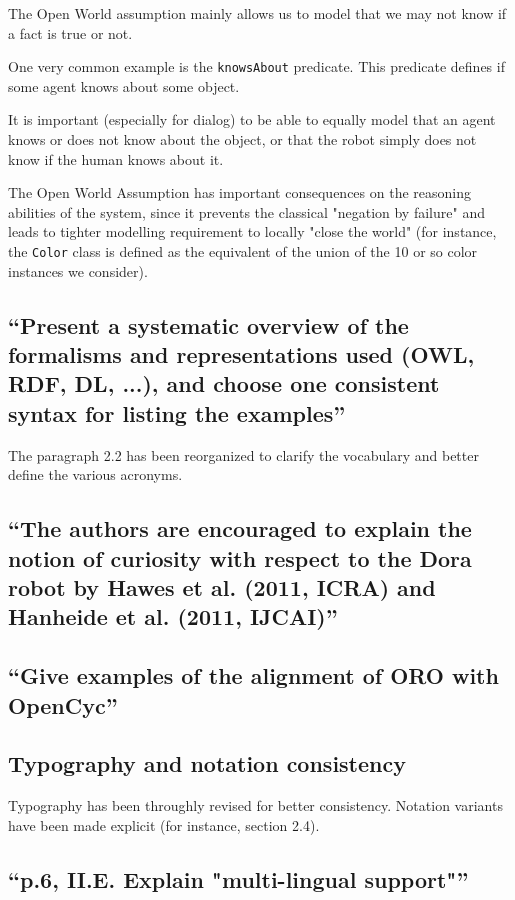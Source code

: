 \documentclass{article}
\begin{document}
The Open World assumption mainly allows us to model that we may not know
if a fact is true or not.

One very common example is the {\tt knowsAbout} predicate. This predicate
defines if some agent knows about some object.

It is important (especially for dialog) to be able to equally model that an agent knows or 
does not know about the object, or that the robot simply does not know if 
the human knows about it.

The Open World Assumption has important consequences on the reasoning
abilities of the system, since it prevents the classical "negation by 
failure" and leads to tighter modelling requirement to locally "close the
world" (for instance, the {\tt Color} class is defined as the equivalent of
the union of the 10 or so color instances we consider).

\subsection{``Present a systematic overview of the formalisms and
representations used (OWL, RDF, DL, ...), and choose one consistent syntax for
listing the examples''}

The paragraph 2.2 has been reorganized to clarify the vocabulary and better
define the various acronyms.

\subsection{``The authors are encouraged to explain the notion of curiosity
with respect to the Dora robot by Hawes et al. (2011, ICRA) and Hanheide et al.
(2011, IJCAI)''}

\subsection{``Give examples of the alignment of ORO with OpenCyc''}

\subsection{Typography and notation consistency}

Typography has been throughly revised for better consistency. Notation variants have been
made explicit (for instance, section 2.4).

\subsection{``p.6, II.E. Explain "multi-lingual support"''}
\end{document}
